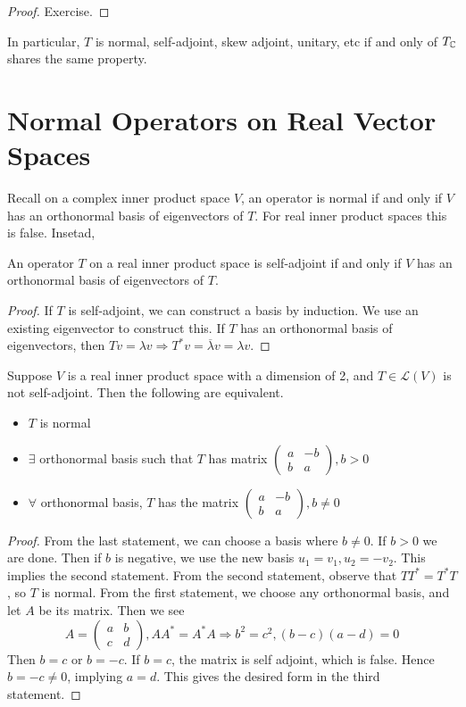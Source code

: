 \documentclass[12pt]{article}
\begin{document}
\begin{proof}
    Exercise.
\end{proof}

In particular, $T$ is normal, self-adjoint, skew adjoint, unitary, etc if and only of $T_{\mathbb{C}}$ shares the same property.

\section{Normal Operators on Real Vector Spaces}

Recall on a complex inner product space $V$, an operator is normal if and only if $V$ has an orthonormal basis of eigenvectors of $T$. For real inner product spaces this is false. Insetad,

\begin{thm}
    An operator $T$ on a real inner product space is self-adjoint if and only if $V$ has an orthonormal basis of eigenvectors of $T$.
\end{thm}

\begin{proof}
    If $T$ is self-adjoint, we can construct a basis by induction. We use an existing eigenvector to construct this.
    If $T$ has an orthonormal basis of eigenvectors, then $Tv = \lambda v \Rightarrow T^*v = \overline \lambda v = \lambda v$.
\end{proof}

\begin{thm}
    Suppose $V$ is a real inner product space with a dimension of 2, and $T \in \mathcal L(V)$ is not self-adjoint. Then the following are equivalent.
    \begin{itemize}
        \item $T$ is normal
        \item $\exists$ orthonormal basis such that $T$ has matrix $\begin{pmatrix} a & -b \\ b & a \end{pmatrix},b>0$
        \item $\forall$ orthonormal basis, $T$ has the matrix $\begin{pmatrix} a & -b \\ b & a \end{pmatrix}, b \neq 0$
    \end{itemize}
\end{thm}

\begin{proof}
    From the last statement, we can choose a basis where $b \neq 0$. If $b>0$ we are done. Then if $b$ is negative, we use the new basis $u_1 = v_1,u_2 = -v_2$. This implies the second statement. From the second statement, observe that $TT^*=T^*T$, so $T$ is normal. From the first statement, we choose any orthonormal basis, and let $A$ be its matrix. Then we see
    $$A = \begin{pmatrix} a & b \\ c & d \end{pmatrix}, AA^* = A^*A \Rightarrow b^2=c^2, (b-c)(a-d) = 0$$
    Then $b=c$ or $b=-c$. If $b=c$, the matrix is self adjoint, which is false. Hence $b=-c\neq0$, implying $a=d$. This gives the desired form in the third statement.
\end{proof}
\end{document}
